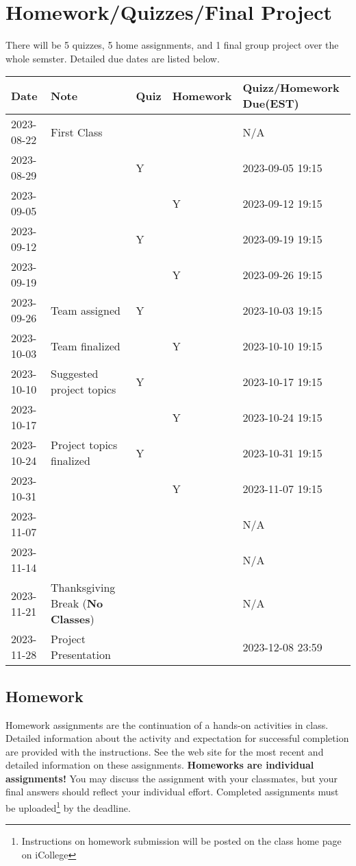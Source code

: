 \documentclass{article}
\begin{document}
\section{Homework/Quizzes/Final Project}
There will be 5 quizzes, 5 home assignments, and 1 final group project over the whole semster. Detailed due dates are listed below.
\begin{center}
	\begin{tabular}{lllll}
		\hline
		Date & Note & Quiz & Homework & Quizz/Homework Due(EST) \\
		\hline
		2023-08-22 & First Class &  &  & N/A \\
    2023-08-29 &  & Y & & 2023-09-05 19:15 \\
    2023-09-05 &  &  & Y & 2023-09-12 19:15 \\
    2023-09-12 &  & Y &  &  2023-09-19 19:15\\
    2023-09-19 &  &  & Y & 2023-09-26 19:15 \\
    2023-09-26 & Team assigned & Y &  & 2023-10-03 19:15 \\
    2023-10-03 & Team finalized  &  & Y & 2023-10-10 19:15 \\
    2023-10-10 & Suggested project topics & Y &  & 2023-10-17 19:15 \\
    2023-10-17 &  &  & Y & 2023-10-24 19:15 \\
    2023-10-24 & Project topics finalized & Y &  & 2023-10-31 19:15 \\
    2023-10-31 &  &  & Y &  2023-11-07 19:15 \\
    2023-11-07 &  &  &  &  N/A\\
    2023-11-14 &  &  &  &  N/A\\
    2023-11-21 & Thanksgiving Break (\textbf{No Classes})  &  &  &  N/A\\
		2023-11-28 & Project Presentation &  &  & 2023-12-08 23:59\\
		\hline        
	\end{tabular}
\end{center}



\subsection{Homework}
Homework assignments are the continuation of a hands-on activities in class. Detailed information about the activity and expectation for successful completion are provided with the instructions. See the web site for the most recent and detailed information on these assignments. \textbf{Homeworks are individual assignments!} You may discuss the assignment with your classmates, but your ﬁnal answers should reﬂect your individual eﬀort. Completed assignments must be uploaded\footnote{Instructions on homework submission will be posted on the class home page on iCollege} by the deadline.
\end{document}
